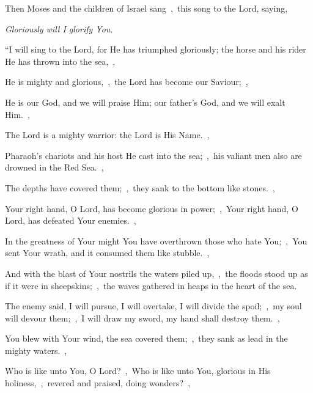 \documentclass[12pt,twoside,a5paper]{article}
\begin{document}




\begin{normalparskip}
  Then Moses and the children of Israel sang~\sep\ this song to the Lord, saying,


   \emph{Gloriously will I glorify You.}

  ``I will sing to the Lord, for He has triumphed gloriously; the horse and his rider He has thrown into the sea,~\sep

  He is mighty and glorious,~\sep\ the Lord has become our Saviour;~\sep

  He is our God, and we will praise Him; our father's God, and we will exalt Him.~\sep

  The Lord is a mighty warrior: the Lord is His Name.~\sep

  Pharaoh's chariots and his host He cast into the sea;~\sep\ his valiant men also are drowned in the Red Sea.~\sep

  The depths have covered them;~\sep\ they sank to the bottom like stones.~\sep

  Your right hand, O Lord, has become glorious in power;~\sep\ Your right hand, O Lord, has defeated Your enemies.~\sep

  In the greatness of Your might You have overthrown those who hate You;~\sep\ You sent Your wrath, and it consumed them like stubble.~\sep

  And with the blast of Your nostrils the waters piled up,~\sep\ the floods stood up as if it were in sheepskins;~\sep\ the waves gathered in heaps in the heart of the sea.

  The enemy said, I will pursue, I will overtake, I will divide the spoil;~\sep\ my soul will devour them;~\sep\ I will draw my sword, my hand shall destroy them.~\sep

  You blew with Your wind, the sea covered them;~\sep\ they sank as lead in the mighty waters.~\sep

  Who is like unto You, O Lord?~\sep\ Who is like unto You, glorious in His holiness,~\sep\ revered and praised, doing wonders?~\sep


\end{normalparskip}
\end{document}
